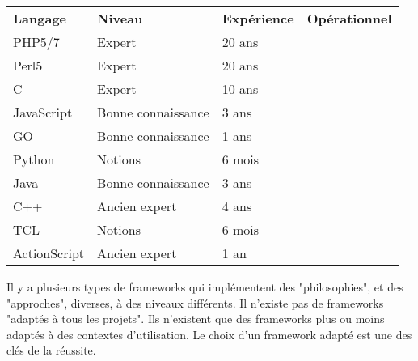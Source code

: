 \documentclass{cv}
\newlength{\vlengthSectionTitleContent}
\newcommand{\fontSynthesisDef}{\setmainfont[Ligatures=TeX]{Accanthis ADF Std Italic}\small}
\newcommand{\skillFull}{\raisebox{-1pt}{\faBatteryFull}}
\newcommand{\skillThreeQuarters}{\raisebox{-1pt}{\faBatteryThreeQuarters}}
\newcommand{\skillHalf}{\raisebox{-1pt}{\faBatteryHalf}}
\newcommand{\skillQuarter}{\raisebox{-1pt}{\faBatteryQuarter}}
\newcommand{\skillEmpty}{\raisebox{-1pt}{\faBatteryEmpty}}
\newcommand{\mainSectionSeparator}[1]{%
   \vspace{10pt}\par%
   \begin{tcolorbox}[notitle,
                     nobeforeafter, %
                     boxrule=0pt,
                     top=1pt,
                     bottom=1pt,
                     halign=center,
                     valign=center,
                     width=\textwidth,
                     colback={colorMainSection}]%
      \fontSectionTitle{#1}%
   \end{tcolorbox}%
   \par%
}%
\newenvironment{sectionComponent}{%
   \vspace{\vlengthSectionTitleContent}\par%
}{%
   \par%
}%
\newcommand{\synthesis}[1]{%
   \begingroup
       \fontSynthesisDef%
       #1%
   \endgroup%
}
\newcommand{\tableHd}[1]{%
   \textbf{#1}
}%
\begin{document}
   \begin{sectionComponent}
      \begin{tabularx}{\textwidth}{|X|X|X|C|}
   
   
          \hline 
          \tableHd{Langage} & \tableHd{Niveau} & \tableHd{Expérience} & \tableHd{Opérationnel} \\
   
   
          \hline
          PHP5/7        & Expert             & 20 ans & \skillFull\\
          \hline
          Perl5         & Expert             & 20 ans & \skillFull  \\
          \hline
          C             & Expert             & 10 ans & \skillThreeQuarters \\
          \hline
          JavaScript    & Bonne connaissance & 3 ans  & \skillThreeQuarters \\
          \hline
          GO            & Bonne connaissance & 1 ans  & \skillThreeQuarters \\
          \hline
          Python        & Notions            & 6 mois & \skillHalf \\
          \hline
          Java          & Bonne connaissance & 3 ans  & \skillHalf \\
          \hline
          C++           & Ancien expert      & 4 ans  & \skillQuarter \\
          \hline
          TCL           & Notions            & 6 mois & \skillQuarter \\
          \hline
          ActionScript  & Ancien expert      & 1 an   & \skillEmpty \\
          \hline
      \end{tabularx}
   \end{sectionComponent}


   \mainSectionSeparator{Frameworks}

   \begin{sectionComponent}
      \synthesis{Il y a plusieurs types de frameworks qui implémentent des "philosophies", et des "approches", diverses,
          à des niveaux différents. Il n'existe pas de frameworks "adaptés à tous les projets". Ils n'existent que des
          frameworks plus ou moins adaptés à des contextes d'utilisation. Le choix d'un framework adapté est une des
          clés de la réussite.}
   \end{sectionComponent}
   
\end{document}
